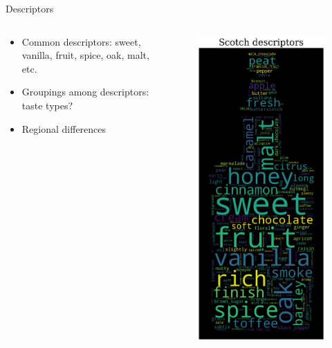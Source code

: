 \documentclass{beamer}
\begin{document}
\begin{frame}{Descriptors}
	\begin{columns}
		\begin{column}{0.5\textwidth}
			\begin{itemize}
				\item Common descriptors: sweet, vanilla, fruit, spice, oak, malt, etc.
				\item Groupings among descriptors: taste types?
				\item Regional differences

				
			\end{itemize}
		\end{column}
		\begin{column}{0.5\textwidth}
			\begin{figure}[H]
				\begin{center}
					\includegraphics[scale = 0.32]{wc_token_unified}

\end{center}
\end{figure}
\end{column}
\end{columns}
\end{frame}
\end{document}

